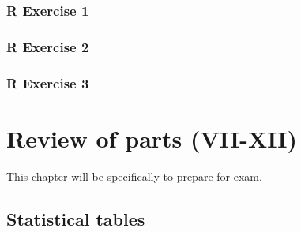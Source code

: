 \documentclass[
]{book}
\begin{document}
\hypertarget{r-exercise-1-1}{%
\section{R Exercise 1}\label{r-exercise-1-1}}

\hypertarget{r-exercise-2-1}{%
\section{R Exercise 2}\label{r-exercise-2-1}}

\hypertarget{r-exercise-3-1}{%
\section{R Exercise 3}\label{r-exercise-3-1}}

\hypertarget{part-review-of-parts-vii-xii}{%
\part{Review of parts (VII-XII)}\label{part-review-of-parts-vii-xii}}

This chapter will be specifically to prepare for exam.

\hypertarget{appendix-appendix}{%
\appendix}


\hypertarget{statistical-tables}{%
\chapter{Statistical tables}\label{statistical-tables}}

  
\end{document}
